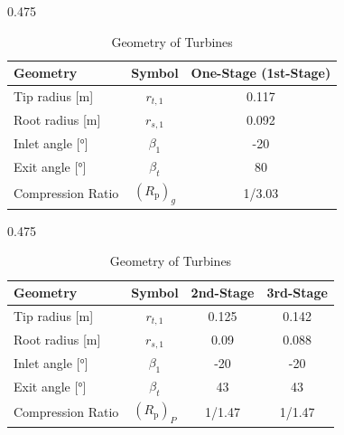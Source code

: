 \documentclass{Format}
\begin{document}
\begin{table}[h!]
    \centering
    
    \begin{subtable}[t]{0.475\textwidth}
        \centering
        \begin{tabular}{|l|c|c|}
            \hline
            \textbf{Geometry} & \textbf{Symbol} & \textbf{One-Stage (1st-Stage)} \\
            \hline
            Tip radius [m] & $r_{t,1}$ & 0.117 \\
            Root radius [m] & $r_{s,1}$ & 0.092 \\
            Inlet angle [°] & $\beta_1$ & -20 \\
            Exit angle [°] & $\beta_t$ & 80 \\
            Compression Ratio & $(R_{\text{p}})_g$ & 1/3.03\\
            \hline
        \end{tabular}
        \caption{Geometry of the Gas Generation Turbine}
        \label{tab:gas_generation_turbine}
    \end{subtable}
    \hfill
    \begin{subtable}[t]{0.475\textwidth}
        \centering
        \begin{tabular}{|l|c|c|c|}
            \hline
            \textbf{Geometry} & \textbf{Symbol} & \textbf{2nd-Stage} & \textbf{3rd-Stage} \\
            \hline
            Tip radius [m] & $r_{t,1}$ & 0.125 & 0.142 \\
            Root radius [m] & $r_{s,1}$ & 0.09 & 0.088 \\
            Inlet angle [°] & $\beta_1$ & -20 & -20 \\
            Exit angle [°] & $\beta_t$ & 43 & 43 \\
            Compression Ratio & $(R_{\text{p}})_P$ & 1/1.47 & 1/1.47\\
            \hline
        \end{tabular}
        \caption{Geometry of the Power Generation Turbines}
        \label{tab:power_generation_turbine}
    \end{subtable}
        \captionsetup{justification=centering} %
    \vspace{10pt}
    \caption{Geometry of Turbines}
    \label{tab:combined_turbine_geometry}
\end{table}
\end{document}
